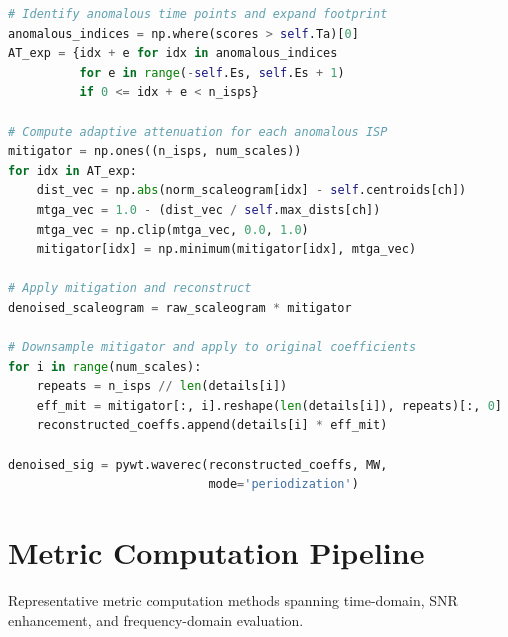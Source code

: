 \documentclass[MScCS,12pt,oneside,final]{uccthesis}
\begin{document}
\begin{lstlisting}[language=Python, caption={Selective attenuation and signal reconstruction}, label={lst:mitigation}]
# Identify anomalous time points and expand footprint
anomalous_indices = np.where(scores > self.Ta)[0]
AT_exp = {idx + e for idx in anomalous_indices
          for e in range(-self.Es, self.Es + 1)
          if 0 <= idx + e < n_isps}

# Compute adaptive attenuation for each anomalous ISP
mitigator = np.ones((n_isps, num_scales))
for idx in AT_exp:
    dist_vec = np.abs(norm_scaleogram[idx] - self.centroids[ch])
    mtga_vec = 1.0 - (dist_vec / self.max_dists[ch])
    mtga_vec = np.clip(mtga_vec, 0.0, 1.0)
    mitigator[idx] = np.minimum(mitigator[idx], mtga_vec)

# Apply mitigation and reconstruct
denoised_scaleogram = raw_scaleogram * mitigator

# Downsample mitigator and apply to original coefficients
for i in range(num_scales):
    repeats = n_isps // len(details[i])
    eff_mit = mitigator[:, i].reshape(len(details[i]), repeats)[:, 0]
    reconstructed_coeffs.append(details[i] * eff_mit)

denoised_sig = pywt.waverec(reconstructed_coeffs, MW, 
                            mode='periodization')
\end{lstlisting}

\section{Metric Computation Pipeline}
\label{app:code_metrics}

Representative metric computation methods spanning time-domain, SNR enhancement, and frequency-domain evaluation.
\end{document}

